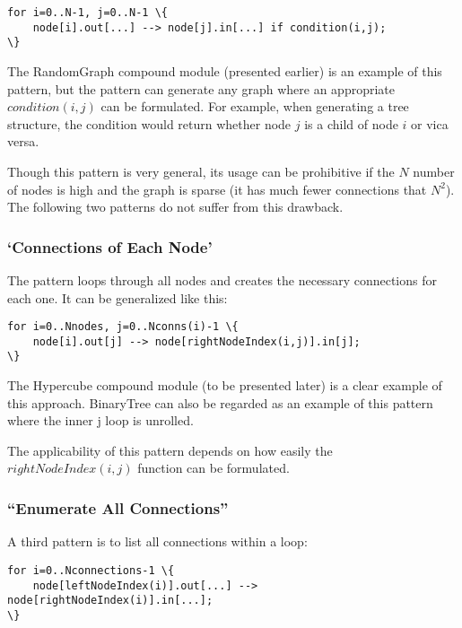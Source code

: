 \begin{Verbatim}[commandchars=\\\{\}]
for i=0..N-1, j=0..N-1 \{
    node[i].out[...] --> node[j].in[...] if condition(i,j);
\}
\end{Verbatim}

The RandomGraph compound module (presented earlier) is an example of
this pattern, but the pattern can generate any graph where an
appropriate $condition(i,j)$ can be formulated. For example,
when generating a tree structure, the condition
would return whether node $j$ is a child of node $i$ or
vica versa.

Though this pattern is very general, its usage can be prohibitive if
the $N$ number of nodes is high and the graph is sparse (it has
much fewer connections that $N^2$). The following
two patterns do not suffer from this drawback.


\subsubsection{`Connections of Each Node'}

The pattern loops through all nodes and creates the necessary
connections for each one. It can be generalized like this:

\begin{Verbatim}[commandchars=\\\{\}]
for i=0..Nnodes, j=0..Nconns(i)-1 \{
    node[i].out[j] --> node[rightNodeIndex(i,j)].in[j];
\}
\end{Verbatim}

The Hypercube compound module (to be
presented later) is a clear example of this approach. BinaryTree can
also be regarded as an example of this pattern where the inner j loop
is unrolled.

The applicability of this pattern depends on how easily the $rightNodeIndex(i,j)$
function can be formulated.


\subsubsection{``Enumerate All Connections''}


A third pattern is to list all connections within a loop:

\begin{Verbatim}[commandchars=\\\{\}]
for i=0..Nconnections-1 \{
    node[leftNodeIndex(i)].out[...] --> node[rightNodeIndex(i)].in[...];
\}
\end{Verbatim}

